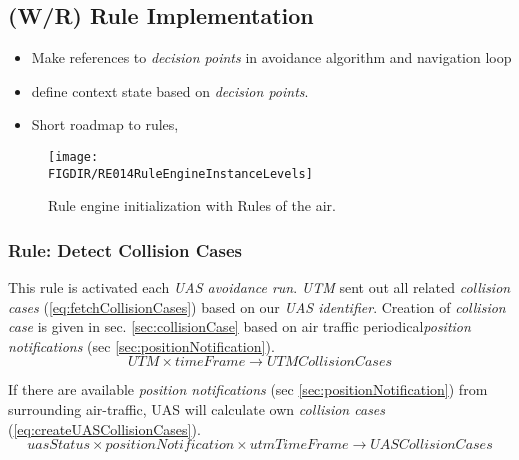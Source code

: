 \subsection{(W/R) Rule Implementation}\label{sec:ruleImplementation}
    \begin{itemize}
        \item Make references to \emph{decision points} in avoidance algorithm and navigation loop
        \item define context state based on \emph{decision points}.
        \item Short roadmap to rules,
    \end{itemize}
    \begin{figure}[H]
        \centering
        \texttt{[image: \\FIGDIR/RE014RuleEngineInstanceLevels]} 
        \caption{Rule engine initialization with Rules of the air.}
        \label{fig:RuleEngineInstanceLevels}
    \end{figure}

\subsubsection{Rule: Detect Collision Cases}
    \noindent This rule is activated each \emph{UAS avoidance run}. \emph{UTM} sent out all related \emph{collision cases} (\ref{eq:fetchCollisionCases}) based on our \emph{UAS identifier}. Creation of \emph{collision case} is given in sec. \ref{sec:collisionCase} based on air traffic periodical\emph{position notifications} (sec \ref{sec:positionNotification}).
    \begin{equation}\label{eq:fetchCollisionCases}
        UTM\times timeFrame \to UTMCollisionCases
    \end{equation}
    
    If there are available \emph{position notifications} (sec \ref{sec:positionNotification}) from surrounding air-traffic, UAS will calculate own \emph{collision cases} (\ref{eq:createUASCollisionCases}).
    \begin{equation}\label{eq:createUASCollisionCases}
        uasStatus\times positionNotification\times utmTimeFrame\to UASCollisionCases
    \end{equation}
    
